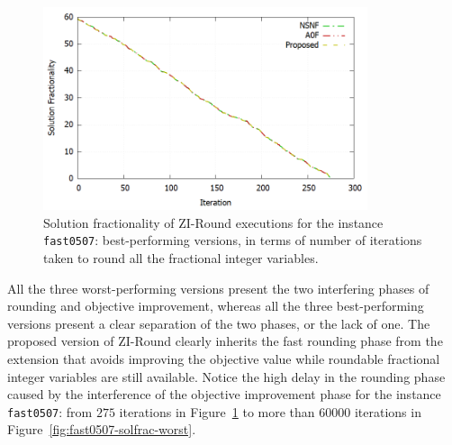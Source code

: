 \documentclass[a4paper,12pt]{book}
\begin{document}
\begin{figure}[ht]
	\centering
	\includegraphics[width=0.85\textwidth]{fast0507-solfrac-best.png}
	\caption{Solution fractionality of ZI-Round executions for the instance \texttt{fast0507}: best-performing versions, in terms of number of iterations taken to round all the fractional integer variables.}
	\label{fig:fast0507-solfrac-best}
\end{figure}
All the three worst-performing versions present the two interfering phases of rounding and objective improvement, whereas all the three best-performing versions present a clear separation of the two phases, or the lack of one. The proposed version of ZI-Round clearly inherits the fast rounding phase from the extension that avoids improving the objective value while roundable fractional integer variables are still available. Notice the high delay in the rounding phase caused by the interference of the objective improvement phase for the instance \texttt{fast0507}: from $275$ iterations in Figure~\ref{fig:fast0507-solfrac-best} to more than $60000$ iterations in Figure~\ref{fig:fast0507-solfrac-worst}. \par
\end{document}

